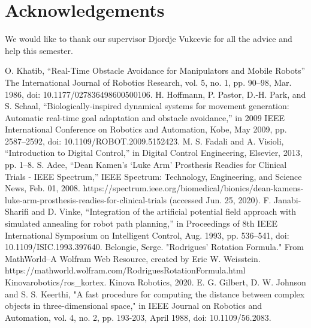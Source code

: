 \documentclass[a4paper, 11.5pt, conference]{ieeeconf}      %
\begin{document}






\section*{Acknowledgements}
We would like to thank our supervisor Djordje Vukcevic for all the advice and help this semester.



\begin{thebibliography}{10}
	
 O. Khatib, “Real-Time Obstacle Avoidance for Manipulators and Mobile Robots” The International Journal of Robotics Research, vol. 5, no. 1, pp. 90–98, Mar. 1986, doi: 10.1177/027836498600500106.
 H. Hoffmann, P. Pastor, D.-H. Park, and S. Schaal, “Biologically-inspired dynamical systems for movement generation: Automatic real-time goal adaptation and obstacle avoidance,” in 2009 IEEE International Conference on Robotics and Automation, Kobe, May 2009, pp. 2587–2592, doi: 10.1109/ROBOT.2009.5152423.
 M. S. Fadali and A. Visioli, “Introduction to Digital Control,” in Digital Control Engineering, Elsevier, 2013, pp. 1–8.
 S. Adee, “Dean Kamen’s ‘Luke Arm’ Prosthesis Readies for Clinical Trials - IEEE Spectrum,” IEEE Spectrum: Technology, Engineering, and Science News, Feb. 01, 2008. https://spectrum.ieee.org/biomedical/bionics/dean-kamens-luke-arm-prosthesis-readies-for-clinical-trials (accessed Jun. 25, 2020).
 F. Janabi-Sharifi and D. Vinke, “Integration of the artificial potential field approach with simulated annealing for robot path planning,” in Proceedings of 8th IEEE International Symposium on Intelligent Control, Aug. 1993, pp. 536–541, doi: 10.1109/ISIC.1993.397640.
  Belongie, Serge. "Rodrigues' Rotation Formula." From MathWorld--A Wolfram Web Resource, created by Eric W. Weisstein. https://mathworld.wolfram.com/RodriguesRotationFormula.html 
 Kinovarobotics/ros\_kortex. Kinova Robotics, 2020.
 E. G. Gilbert, D. W. Johnson and S. S. Keerthi, "A fast procedure for computing the distance between complex objects in three-dimensional space," in IEEE Journal on Robotics and Automation, vol. 4, no. 2, pp. 193-203, April 1988, doi: 10.1109/56.2083.



\end{thebibliography}
\end{document}
